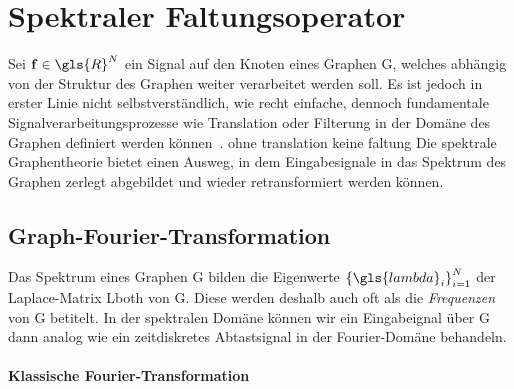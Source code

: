 \section{Spektraler Faltungsoperator}
\label{spektraler_faltungsoperator}

Sei $\ve{f} \in \gls{R}^N$ ein Signal auf den Knoten eines Graphen \gls{G}, welches abhängig von der Struktur des Graphen weiter verarbeitet werden soll.
Es ist jedoch in erster Linie nicht selbstverständlich, wie recht einfache, dennoch fundamentale Signalverarbeitungsprozesse wie Translation oder Filterung in der Domäne des Graphen definiert werden können~\cite{Shuman}.
 ohne translation keine faltung
Die spektrale Graphentheorie bietet einen Ausweg, in dem Eingabesignale in das Spektrum des Graphen zerlegt \bzw{} abgebildet und wieder retransformiert werden können.

\subsection{Graph-Fourier-Transformation}
\label{graph_fourier_transformation}

Das Spektrum eines Graphen \gls{G} bilden die Eigenwerte ${\left\{\gls{lambda}_i\right\}}_{i=1}^N$ der Laplace-Matrix \gls{Lboth} von \gls{G}.
Diese werden deshalb auch oft als die \emph{Frequenzen} von \gls{G} betitelt.
In der spektralen Domäne können wir ein Eingabeignal  über \gls{G} dann analog wie ein zeitdiskretes Abtastsignal in der Fourier-Domäne behandeln.

\paragraph{Klassische Fourier-Transformation}
\label{klassische_fourier_transformation}

